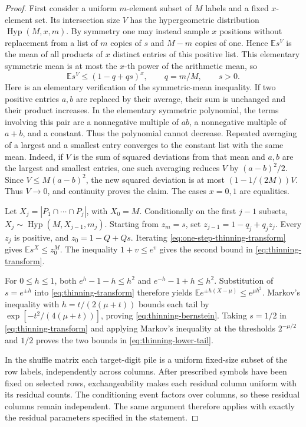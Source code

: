 \documentclass[11pt]{article}
\numberwithin{equation}{section}
\newcommand{\E}{\mathbb E}
\newcommand{\1}{\mathbf 1}
\begin{document}
\begin{proof}
First consider a uniform \(m\)-element subset of \(M\) labels and a fixed
\(x\)-element set. Its intersection size \(V\) has the hypergeometric
distribution \(\operatorname{Hyp}(M,x,m)\). By symmetry one may instead
sample \(x\) positions without replacement from a list of \(m\) copies
of \(s\) and \(M-m\) copies of one. Hence \(\E s^V\) is the mean
of all products of \(x\) distinct entries of this positive list.
This elementary symmetric mean is at most the \(x\)-th power of the
arithmetic mean, so
\begin{equation}
\label{eq:one-step-thinning-transform}
 \E s^V\le(1-q+qs)^x,\qquad q=m/M,
 \qquad s>0.
\end{equation}
Here is an elementary verification of the symmetric-mean inequality.
If two positive entries \(a,b\) are replaced by their average, their sum
is unchanged and their product increases. In the elementary symmetric
polynomial, the terms involving this pair are a nonnegative multiple of
\(ab\), a nonnegative multiple of \(a+b\), and a constant. Thus the
polynomial cannot decrease. Repeated averaging of a largest and a smallest
entry converges to the constant list with the same mean. Indeed, if $V$
is the sum of squared deviations from that mean and $a,b$ are the largest
and smallest entries, one such averaging reduces $V$ by $(a-b)^2/2$.
Since $V\le M(a-b)^2$, the new squared deviation is at most
$(1-1/(2M))V$. Thus $V\to0$, and continuity proves the claim.
The cases \(x=0,1\) are equalities.

Let \(X_j=|P_1\cap\cdots\cap P_j|\), with \(X_0=M\).
Conditionally on the first \(j-1\) subsets,
\(X_j\sim\operatorname{Hyp}(M,X_{j-1},m_j)\).
Starting from \(z_m=s\), set
\(z_{j-1}=1-q_j+q_jz_j\). Every \(z_j\) is positive, and
\(z_0=1-Q+Qs\). Iterating \eqref{eq:one-step-thinning-transform}
gives \(\E s^X\le z_0^M\). The inequality \(1+v\le e^v\)
gives the second bound in \eqref{eq:thinning-transform}.

For \(0\le h\le1\), both
\(e^h-1-h\le h^2\) and \(e^{-h}-1+h\le h^2\).
Substitution of \(s=e^{\pm h}\) into
\eqref{eq:thinning-transform} therefore yields
\(\E e^{\pm h(X-\mu)}\le e^{\mu h^2}\).
Markov's inequality with \(h=t/(2(\mu+t))\) bounds each tail by
\(\exp[-t^2/(4(\mu+t))]\), proving
\eqref{eq:thinning-bernstein}.
Taking \(s=1/2\) in \eqref{eq:thinning-transform} and applying
Markov's inequality at the thresholds \(2^{-\mu/2}\) and \(1/2\)
proves the two bounds in \eqref{eq:thinning-lower-tail}.

In the shuffle matrix each target-digit pile is a uniform fixed-size
subset of the row labels, independently across columns. After prescribed
symbols have been fixed on selected rows, exchangeability makes each
residual column uniform with its residual counts. The conditioning event
factors over columns, so these residual columns remain independent.
The same argument therefore applies with exactly the residual parameters
specified in the statement.
\end{proof}
\end{document}
